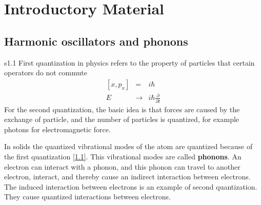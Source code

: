 \chapter{Introductory Material}

\section{Harmonic oscillators and phonons}{s1.1}
First quantization in physics refers to the property of particles that certain operators do not commute
\begin{eqnarray}
    \left[ x, p_x \right] &=& i\hbar  \label{1.1} \\
    E &\to& i\hbar \frac{\partial}{\partial t}  \label{1.2}
\end{eqnarray}
For the second quantization, the basic idea is that forces are caused by the exchange of particle, and the number of particles is quantized, for example photons for electromagnetic force.

In solids the quantized vibrational modes of the atom are quantized because of the first quantization \eqref{1.1}.
This vibrational modes are called \textbf{phonons}.
An electron can interact with a phonon, and this phonon can travel to another electron, interact, and thereby cause an indirect interaction between electrons.
The induced interaction between electrons is an example of second quantization.
They cause quantized interactions between electrons.

